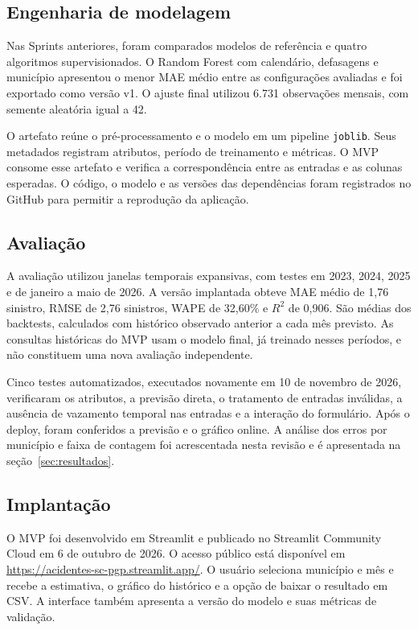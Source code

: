 \documentclass[12pt]{article}
\begin{document}
\subsection{Engenharia de modelagem}

Nas Sprints anteriores, foram comparados modelos de referência e quatro algoritmos supervisionados. O Random Forest com calendário, defasagens e município apresentou o menor MAE médio entre as configurações avaliadas e foi exportado como versão v1. O ajuste final utilizou 6.731 observações mensais, com semente aleatória igual a 42.

O artefato reúne o pré-processamento e o modelo em um pipeline \texttt{joblib}. Seus metadados registram atributos, período de treinamento e métricas. O MVP consome esse artefato e verifica a correspondência entre as entradas e as colunas esperadas. O código, o modelo e as versões das dependências foram registrados no GitHub para permitir a reprodução da aplicação.

\subsection{Avaliação}

A avaliação utilizou janelas temporais expansivas, com testes em 2023, 2024, 2025 e de janeiro a maio de 2026. A versão implantada obteve MAE médio de 1,76 sinistro, RMSE de 2,76 sinistros, WAPE de 32,60\% e $R^2$ de 0,906. São médias dos backtests, calculados com histórico observado anterior a cada mês previsto. As consultas históricas do MVP usam o modelo final, já treinado nesses períodos, e não constituem uma nova avaliação independente.

Cinco testes automatizados, executados novamente em 10 de novembro de 2026, verificaram os atributos, a previsão direta, o tratamento de entradas inválidas, a ausência de vazamento temporal nas entradas e a interação do formulário. Após o deploy, foram conferidos a previsão e o gráfico online. A análise dos erros por município e faixa de contagem foi acrescentada nesta revisão e é apresentada na seção~\ref{sec:resultados}.

\subsection{Implantação}

O MVP foi desenvolvido em Streamlit e publicado no Streamlit Community Cloud em 6 de outubro de 2026. O acesso público está disponível em \url{https://acidentes-sc-pgp.streamlit.app/}. O usuário seleciona município e mês e recebe a estimativa, o gráfico do histórico e a opção de baixar o resultado em CSV. A interface também apresenta a versão do modelo e suas métricas de validação.
\end{document}
